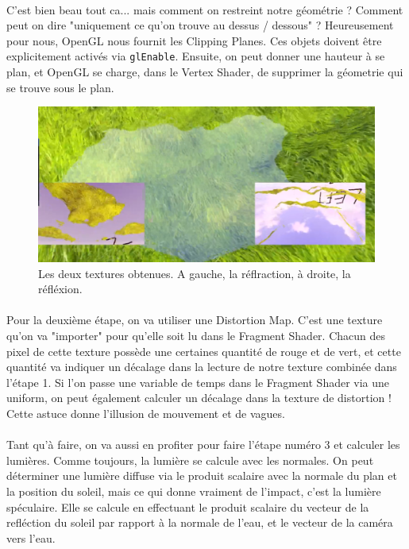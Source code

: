 \documentclass{EPUProjetDi}
\newcommand{\code}{\texttt}
\begin{document}
\paragraph{}
C'est bien beau tout ca... mais comment on restreint notre géométrie ? Comment peut on dire "uniquement ce qu'on trouve au dessus / dessous" ?
Heureusement pour nous, OpenGL nous fournit les Clipping Planes. Ces objets doivent être explicitement activés via \code{glEnable}.
Ensuite, on peut donner une hauteur à se plan, et OpenGL se charge, dans le Vertex Shader, de supprimer la géometrie qui se trouve sous le plan.
\begin{figure}[h]
	\centering
	\includegraphics[scale=.3]{water_textures}
	\caption{Les deux textures obtenues. A gauche, la réflraction, à droite, la réfléxion.}
	\label{fig:water_textures}
\end{figure}

\paragraph{}
Pour la deuxième étape, on va utiliser une Distortion Map. C'est une texture qu'on va "importer" pour qu'elle soit lu dans le Fragment Shader.
Chacun des pixel de cette texture possède une certaines quantité de rouge et de vert, et cette quantité va indiquer un décalage dans la lecture de notre texture combinée dans l'étape 1.
Si l'on passe une variable de temps dans le Fragment Shader via une uniform, on peut également calculer un décalage dans la texture de distortion ! Cette astuce donne l'illusion de mouvement et de vagues.

\paragraph{}
Tant qu'à faire, on va aussi en profiter pour faire l'étape numéro 3 et calculer les lumières.
Comme toujours, la lumière se calcule avec les normales. On peut déterminer une lumière diffuse via le produit scalaire avec la normale du plan et la position du soleil, mais ce qui donne vraiment de l'impact, c'est la lumière spéculaire.
Elle se calcule en effectuant le produit scalaire du vecteur de la refléction du soleil par rapport à la normale de l'eau, et le vecteur de la caméra vers l'eau.
\end{document}

